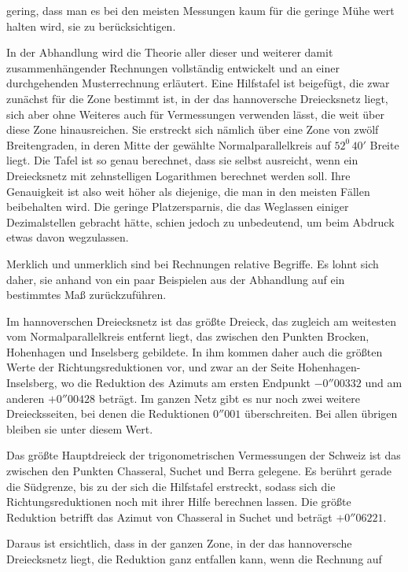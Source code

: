 %
gering, dass man es bei den meisten Messungen kaum für die geringe Mühe wert halten wird, sie zu berücksichtigen.

In der Abhandlung wird die Theorie aller dieser und weiterer damit zusammenhängender Rechnungen vollständig entwickelt und an einer durchgehenden Musterrechnung erläutert. Eine Hilfstafel ist beigefügt, die zwar zunächst für die Zone bestimmt ist, in der das hannoversche Dreiecksnetz liegt, sich aber ohne Weiteres auch für Vermessungen verwenden lässt, die weit über diese Zone hinausreichen. Sie erstreckt sich nämlich über eine Zone von zwölf Breitengraden, in deren Mitte der gewählte Normalparallelkreis auf \(52^0\,40'\) Breite liegt. Die Tafel ist so genau berechnet, dass sie selbst ausreicht, wenn ein Dreiecksnetz mit zehnstelligen Logarithmen berechnet werden soll. Ihre Genauigkeit ist also weit höher als diejenige, die man in den meisten Fällen beibehalten wird. Die geringe Platzersparnis, die das Weglassen einiger Dezimalstellen gebracht hätte, schien jedoch zu unbedeutend, um beim Abdruck etwas davon wegzulassen.

Merklich und unmerklich sind bei Rechnungen relative Begriffe. Es lohnt sich daher, sie anhand von ein paar Beispielen aus der Abhandlung auf ein bestimmtes Maß zurückzuführen.

Im hannoverschen Dreiecksnetz ist das größte Dreieck, das zugleich am weitesten vom Normalparallelkreis entfernt liegt, das zwischen den Punkten Brocken, Hohenhagen und Inselsberg gebildete. In ihm kommen daher auch die größten Werte der Richtungsreduktionen vor, und zwar an der Seite Hohenhagen-Inselsberg, wo die Reduktion des Azimuts am ersten Endpunkt \(-0''00332\) und am anderen \(+0''00428\) beträgt. Im ganzen Netz gibt es nur noch zwei weitere Dreiecksseiten, bei denen die Reduktionen \(0''001\) überschreiten. Bei allen übrigen bleiben sie unter diesem Wert.

Das größte Hauptdreieck der trigonometrischen Vermessungen der Schweiz ist das zwischen den Punkten Chasseral, Suchet und Berra gelegene. Es berührt gerade die Südgrenze, bis zu der sich die Hilfstafel erstreckt, sodass sich die Richtungsreduktionen noch mit ihrer Hilfe berechnen lassen. Die größte Reduktion betrifft das Azimut von Chasseral in Suchet und beträgt \(+0''06221\).

Daraus ist ersichtlich, dass in der ganzen Zone, in der das hannoversche Dreiecksnetz liegt, die Reduktion ganz entfallen kann, wenn die Rechnung auf
